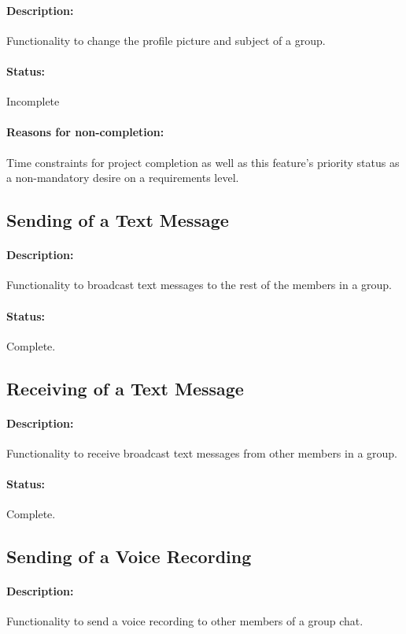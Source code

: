 \documentclass[11pt]{article}
\begin{document}
\paragraph{Description:} Functionality to change the profile picture and subject of a group.
\paragraph{Status:} Incomplete
\paragraph{Reasons for non-completion:} Time constraints for project completion as well as this feature's priority status as a non-mandatory desire on a requirements level.

\subsection{Sending of a Text Message}
\paragraph{Description:} Functionality to broadcast text messages to the rest of the members in a group.
\paragraph{Status:} Complete.

\subsection{Receiving of a Text Message}
\paragraph{Description:} Functionality to receive broadcast text messages from other members in a group.
\paragraph{Status:} Complete.

\subsection{Sending of a Voice Recording}
\paragraph{Description:} Functionality to send a voice recording to other members of a group chat.
\end{document}
